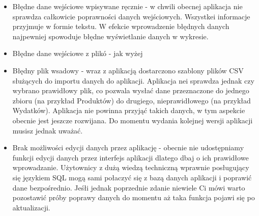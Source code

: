 \documentclass[a4paper,10pt, twoside]{report}
\begin{document}
\begin{itemize}
    \item Błędne dane wejściowe wpisywane ręcznie - w chwili obecnej aplikacja 
    nie sprawdza całkowicie poprawności danych wejściowych. Wszystkei informacje
     przyjmuje w formie tekstu. W efekcie wprowadzenie błędnych danych 
     najpewniej spowoduje błędne wyświetlanie danych w wykresie.
    \item Błędne dane wejściowe z plikó - jak wyżej
    \item Błędny plik wsadowy - wraz z aplikacją dostarczono szablony plików CSV 
    służących do importu danych do aplikacji. Aplikacja nei sprawdza jednak czy 
    wybrano prawidłowy plik, co pozwala wysłać dane przeznaczone do jednego 
    zbioru (na przykład Produktów) do drugiego, nieprawidłowego (na przykład 
    Wydatków). Aplikacja nie powinna przyjąć takich danych, w tym aspekcie 
    obecnie jest jeszcze rozwijana. Do momentu wydania kolejnej wersji aplikacji
     musisz jednak uważać.
    \item Brak możliwości edycji danych przez aplikację - obecnie nie 
    udostępniamy funkcji edycji danych przez interfejs aplikacji dlatego dbaj 
    o ich prawidłowe wprowadzanie. Użytownicy z dużą wiedzą techniczną wprawnie 
    posługujący się językiem SQL mogą sami połaczyć się z bazą danych aplikacji 
    i poprawić dane bezpośrednio. Jeśłi jednak poprzednie zdanie niewiele Ci 
    mówi warto pozostawić próby poprawy danych do momentu aż taka funkcja pojawi
     się po aktualizacji. 
\end{itemize}
\end{document}
